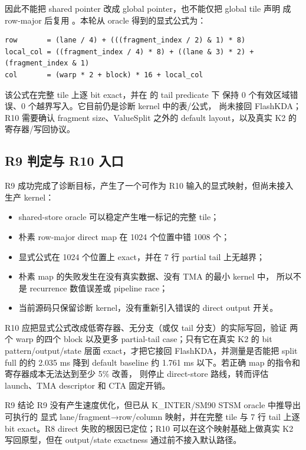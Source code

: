 因此不能把 shared pointer 改成 global pointer，也不能仅把 global tile 声明
成 row-major 后复用 。本轮从 oracle 得到的显式公式为：

\begin{lstlisting}
row       = (lane / 4) + (((fragment_index / 2) & 1) * 8)
local_col = ((fragment_index / 4) * 8) + ((lane & 3) * 2) + (fragment_index & 1)
col       = (warp * 2 + block) * 16 + local_col
\end{lstlisting}

该公式在完整 tile 上逐 bit exact，并在  的 tail predicate 下
保持 0 个有效区域错误、0 个越界写入。它目前仍是诊断 kernel 中的表/公式，
尚未接回 FlashKDA；R10 需要确认 fragment size、ValueSplit 之外的 default
layout，以及真实 K2 的寄存器/写回协议。

\subsection{R9 判定与 R10 入口}

R9 成功完成了诊断目标，产生了一个可作为 R10 输入的显式映射，但尚未接入
生产 kernel：

\begin{itemize}
  \item shared-store oracle 可以稳定产生唯一标记的完整 tile；
  \item 朴素 row-major direct map 在 1024 个位置中错 1008 个；
  \item 显式公式在 1024 个位置上 exact，并在 7 行 partial tail 上无越界；
  \item 朴素 map 的失败发生在没有真实数据、没有 TMA 的最小 kernel 中，
        所以不是 recurrence 数值误差或 pipeline race；
  \item 当前源码只保留诊断 kernel，没有重新引入错误的 direct output 开关。
\end{itemize}

R10 应把显式公式改成低寄存器、无分支（或仅 tail 分支）的实际写回，验证
两个 warp 的四个 block 以及更多 partial-tail case；只有它在真实 K2 的
bit pattern/output/state 层面 exact，才把它接回
FlashKDA，并测量是否能把 split full 的约 2.035 ms 降到 default baseline
约 1.761 ms 以下。若正确 map 的指令和寄存器成本无法达到至少 5\% 改善，
则停止 direct-store 路线，转而评估 launch、TMA descriptor 和 CTA 固定开销。

\begin{record}{R9 结论}
R9 没有产生速度优化，但已从 K\_INTER/SM90 STSM oracle 中推导出可执行的
显式 lane/fragment→row/column 映射，并在完整 tile 与 7 行 tail 上逐 bit
exact。R8 direct 失败的根因已定位；R10 可以在这个映射基础上做真实 K2
写回原型，但在 output/state exactness 通过前不接入默认路径。
\end{record}
